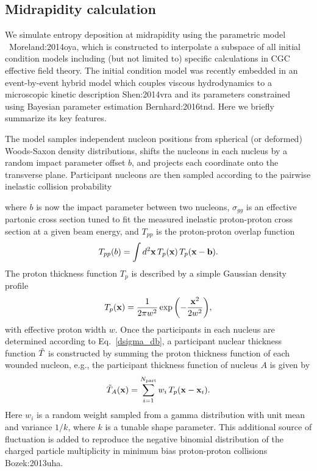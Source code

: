 \subsection{Midrapidity calculation}
We simulate entropy deposition at midrapidity using the parametric model \trento\ {Moreland:2014oya}, which is constructed to interpolate a subspace of all initial condition models including (but not limited to) specific calculations in CGC effective field theory.
The initial condition model was recently embedded in an event-by-event hybrid model which couples viscous hydrodynamics to a microscopic kinetic description {Shen:2014vra} and its parameters constrained using Bayesian parameter estimation {Bernhard:2016tnd}.
Here we briefly summarize its key features.

The model samples independent nucleon positions from spherical (or deformed) Woods-Saxon density distributions, shifts the nucleons in each nucleus by a random impact parameter offset $b$, and projects each coordinate onto the transverse plane.
Participant nucleons are then sampled according to the pairwise inelastic collision probability

where $b$ is now the impact parameter between two nucleons, $\sigma_{gg}$ is an effective partonic cross section tuned to fit the measured inelastic proton-proton cross section at a given beam energy, and $T_{pp}$ is the proton-proton overlap function
\begin{equation}
  T_{pp}(b) = \int d^2\mathbf x\, T_p(\mathbf x)\,T_p(\mathbf x - \mathbf b).
\end{equation}
The proton thickness function $T_p$ is described by a simple Gaussian density profile
\begin{equation}
  T_p(\mathbf x) = \frac{1}{2 \pi w^2} \exp\bigg({-}\frac{\mathbf x^2}{2 w^2}\bigg),
  \label{nucleon_profile}
\end{equation}
with effective proton width $w$.
Once the participants in each nucleus are determined according to Eq.~\eqref{dsigma_db}, a participant nuclear thickness function $\tilde{T}$ is constructed by summing the proton thickness function of each wounded nucleon, e.g., the participant thickness function of nucleus $A$ is given by
\begin{equation}
  \tilde{T}_A(\mathbf x) = \sum\limits_{i=1}^{N_\text{part}} w_i\, T_p(\mathbf x - \mathbf x_i).
\end{equation}
Here $w_i$ is a random weight sampled from a gamma distribution with unit mean and variance $1/k$, where $k$ is a tunable shape parameter.
This additional source of fluctuation is added to reproduce the negative binomial distribution of the charged particle multiplicity in minimum bias proton-proton collisions {Bozek:2013uha}.

